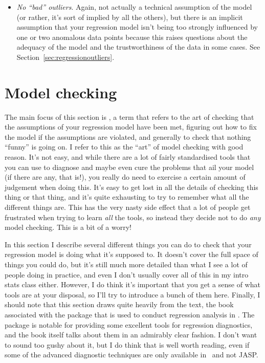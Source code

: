 \begin{itemize}
\item {\it No ``bad'' outliers}. Again, not actually a technical assumption of the model (or rather, it's sort of implied by all the others), but there is an implicit assumption that your regression model isn't being too strongly influenced by one or two anomalous data points because this raises questions about the adequacy of the model and the trustworthiness of the data in some cases. See Section~\ref{sec:regressionoutliers}.
\end{itemize}

\section{Model checking~\label{sec:regressiondiagnostics}}

The main focus of this section is , a term that refers to the art of checking that the assumptions of your regression model have been met, figuring out how to fix the model if the assumptions are violated, and generally to check that nothing ``funny'' is going on. I refer to this as the ``art'' of model checking with good reason. It's not easy, and while there are a lot of fairly standardised tools that you can use to diagnose and maybe even cure the problems that ail your model (if there are any, that is!), you really do need to exercise a certain amount of judgement when doing this. It's easy to get lost in all the details of checking this thing or that thing, and it's quite exhausting to try to remember what all the different things are. This has the very nasty side effect that a lot of people get frustrated when trying to learn {\it all} the tools, so instead they decide not to do {\it any} model checking. This is a bit of a worry! 

In this section I describe several different things you can do to check that your regression model is doing what it's supposed to. It doesn't cover the full space of things you could do, but it's still much more detailed than what I see a lot of people doing in practice, and even I don't usually cover all of this in my intro stats class either. However, I do think it's important that you get a sense of what tools are at your disposal, so I'll try to introduce a bunch of them here. Finally, I should note that this section draws quite heavily from the \textcite{Fox2011} text, the book associated with the  package that is used to conduct regression analysis in \R. The  package is notable for providing some excellent tools for regression diagnostics, and the book itself talks about them in an admirably clear fashion. I don't want to sound too gushy about it, but I do think that \textcite{Fox2011} is well worth reading, even if some of the advanced diagnostic techniques are only available in \R\ and not JASP.

